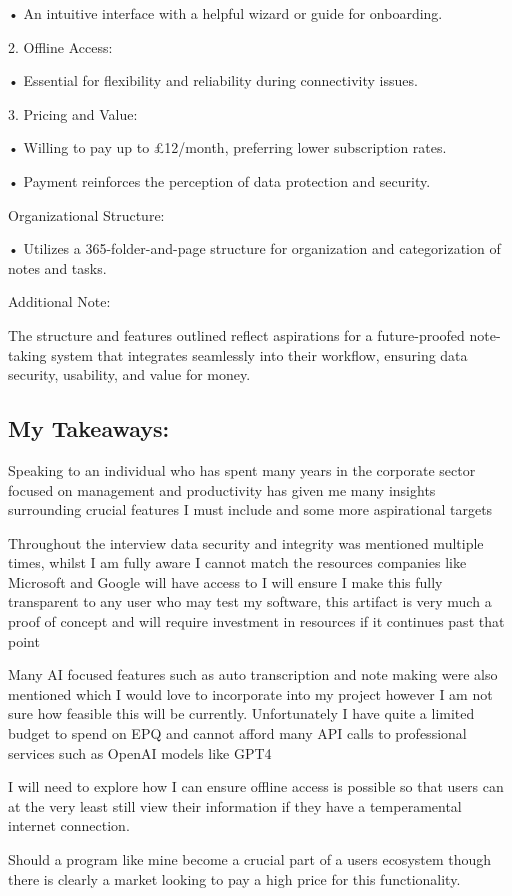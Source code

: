 	•	An intuitive interface with a helpful wizard or guide for onboarding.

	2.	Offline Access:

	•	Essential for flexibility and reliability during connectivity issues.

	3.	Pricing and Value:

	•	Willing to pay up to £12/month, preferring lower subscription rates.

	•	Payment reinforces the perception of data protection and security.

Organizational Structure:

	•	Utilizes a 365-folder-and-page structure for organization and categorization of notes and tasks.

Additional Note:

The structure and features outlined reflect aspirations for a future-proofed note-taking system that integrates seamlessly into their workflow, ensuring data security, usability, and value for money.

\subsection*{My Takeaways:}

Speaking to an individual who has spent many years in the corporate sector focused on management and productivity has given me many insights surrounding crucial features I must include and some more aspirational targets

Throughout the interview data security and integrity was mentioned multiple times, whilst I am fully aware I cannot match the resources companies like Microsoft and Google will have access to I will ensure I make this fully transparent to any user who may test my software, this artifact is very much a proof of concept and will require investment in resources if it continues past that point

Many AI focused features such as auto transcription and note making were also mentioned which I would love to incorporate into my project however I am not sure how feasible this will be currently. Unfortunately I have quite a limited budget to spend on EPQ and cannot afford many API calls to professional services such as OpenAI models like GPT4

I will need to explore how I can ensure offline access is possible so that users can at the very least still view their information if they have a temperamental internet connection.

Should a program like mine become a crucial part of a users ecosystem though there is clearly a market looking to pay a high price for this functionality.


